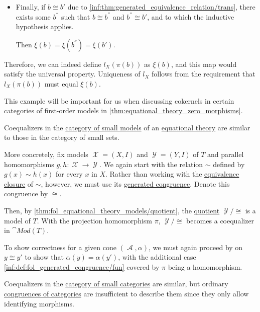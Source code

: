 \begin{example}
\begin{thmenum}
\begin{itemize}
      Then \( \xi(b') = \xi(b) \), so naturally \( \xi(b) = \xi(b') \).

      \item Finally, if \( b \cong b' \) due to \ref{inf:thm:generated_equivalence_relation/trans}, there exists some \( b^\dprime \) such that \( b \cong b^\dprime \) and \( b^\dprime \cong b' \), and to which the inductive hypothesis applies.

      Then \( \xi(b) = \xi(b^\dprime) = \xi(b') \).
    \end{itemize}

    Therefore, we can indeed define \( l_X(\pi(b)) \) as \( \xi(b) \), and this map would satisfy the universal property. Uniqueness of \( l_X \) follows from the requirement that \( l_X(\pi(b)) \) must equal \( \xi(b) \).

    This example will be important for us when discussing cokernels in certain categories of first-order models in \cref{thm:equational_theory_zero_morphisms}.

     Coequalizers in the \hyperref[def:fol_theory_model_functor/obj]{category of small models} of an \hyperref[def:fol_equational_theory]{equational theory} are similar to those in the category of small sets.

    More concretely, fix models \( \mscrX = (X, I) \) and \( \mscrY = (Y, I) \) of \( T \) and parallel homomorphisms \( g, h: \mscrX \to \mscrY \). We again start with the relation \( {\sim} \) defined by \( g(x) \sim h(x) \) for every \( x \) in \( X \). Rather than working with the \hyperref[def:equivalence_closure]{equivalence closure} of \( {\sim} \), however, we must use its \hyperref[def:fol_generated_congruence]{generated congruence}. Denote this congruence by \( {\cong} \).

    Then, by \cref{thm:fol_equational_theory_models/quotient}, the \hyperref[def:fol_quotient_structure]{quotient} \( \mscrY / {\cong} \) is a model of \( T \). With the projection homomorphism \( \pi \), \( \mscrY / {\cong} \) becomes a coequalizer in \( \cat{Mod}(T) \).

    To show correctness for a given cone \( (\mscrA, \alpha) \), we must again proceed by  on \( y \cong y' \) to show that \( \alpha(y) = \alpha(y') \), with the additional case \ref{inf:def:fol_generated_congruence/fun} covered by \( \pi \) being a homomorphism.

     Coequalizers in the \hyperref[def:category_of_small_categories]{category of small categories} are similar, but ordinary \hyperref[def:congruence_in_category]{congruences of categories} are insufficient to describe them since they only allow identifying morphisms.


\end{thmenum}
\end{example}
